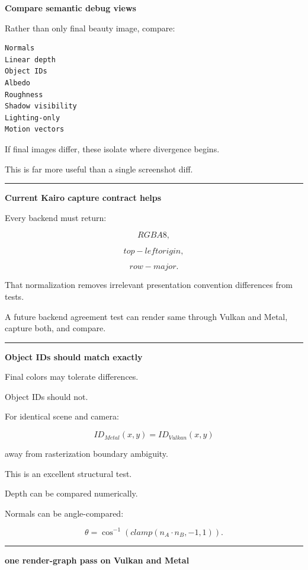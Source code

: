 \textbf{Compare semantic debug views}

Rather than only final beauty image, compare:

\begin{verbatim}
Normals
Linear depth
Object IDs
Albedo
Roughness
Shadow visibility
Lighting-only
Motion vectors
\end{verbatim}

If final images differ, these isolate where divergence begins.

This is far more useful than a single screenshot diff.

\begin{center}\rule{0.5\linewidth}{0.5pt}\end{center}

\textbf{Current Kairo capture contract helps}

Every backend must return:

\[
RGBA8,
\]

\[
top-left origin,
\]

\[
row-major.
\]

That normalization removes irrelevant presentation convention differences from tests.

A future backend agreement test can render same  through Vulkan and Metal, capture both, and compare.

\begin{center}\rule{0.5\linewidth}{0.5pt}\end{center}

\textbf{Object IDs should match exactly}

Final colors may tolerate differences.

Object IDs should not.

For identical scene and camera:

\[
ID_{Metal}(x,y)
=
ID_{Vulkan}(x,y)
\]

away from rasterization boundary ambiguity.

This is an excellent structural test.

Depth can be compared numerically.

Normals can be angle-compared:

\[
\theta=
\cos^{-1}
(
clamp(
n_A\cdot n_B,
-1,1
)).
\]

\begin{center}\rule{0.5\linewidth}{0.5pt}\end{center}

\textbf{one render-graph pass on Vulkan and Metal}

